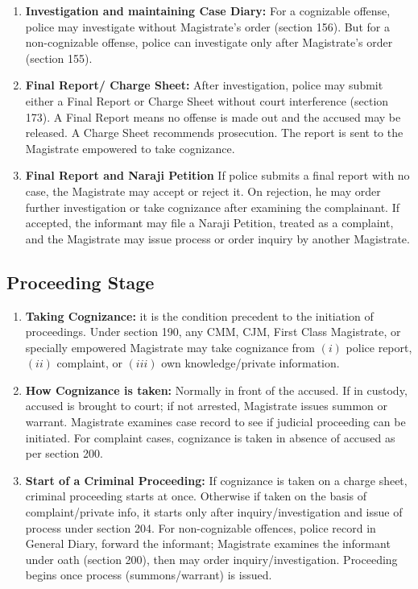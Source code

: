 \begin{enumerate}[label=$({\roman*})$, itemsep=1em]
   \item \textbf{Investigation and maintaining Case Diary:}
   For a cognizable offense, police may investigate without Magistrate's order (section 156). But for a non-cognizable offense, police can investigate only after Magistrate's order (section 155).

   \item \textbf{Final Report/ Charge Sheet:}
   After investigation, police may submit either a Final Report or Charge Sheet without court interference (section 173). A Final Report means no offense is made out and the accused may be released. A Charge Sheet recommends prosecution. The report is sent to the Magistrate empowered to take cognizance.

   \item \textbf{Final Report and Naraji Petition}
   If police submits a final report with no case, the Magistrate may accept or reject it. On rejection, he may order further investigation or take cognizance after examining the complainant. If accepted, the informant may file a Naraji Petition, treated as a complaint, and the Magistrate may issue process or order inquiry by another Magistrate.
\end{enumerate}

\subsection{Proceeding Stage}
\begin{enumerate}[label=$({\roman*})$, itemsep=1em]
   \item \textbf{Taking Cognizance:} it is the condition precedent to the initiation of proceedings. Under section 190, any CMM, CJM, First Class Magistrate, or specially empowered Magistrate may take cognizance from $(i)$ police report, $(ii)$ complaint, or $(iii)$ own knowledge/private information.
   \item \textbf{How Cognizance is taken:} Normally in front of the accused. If in custody, accused is brought to court; if not arrested, Magistrate issues summon or warrant. Magistrate examines case record to see if judicial proceeding can be initiated. For complaint cases, cognizance is taken in absence of accused as per section 200.
   \item \textbf{Start of a Criminal Proceeding:} If cognizance is taken on a charge sheet, criminal proceeding starts at once. Otherwise if taken on the basis of complaint/private info, it starts only after inquiry/investigation and issue of process under section 204. For non-cognizable offences, police record in General Diary, forward the informant; Magistrate examines the informant under oath (section 200), then may order inquiry/investigation. Proceeding begins once process (summons/warrant) is issued.
\end{enumerate}



